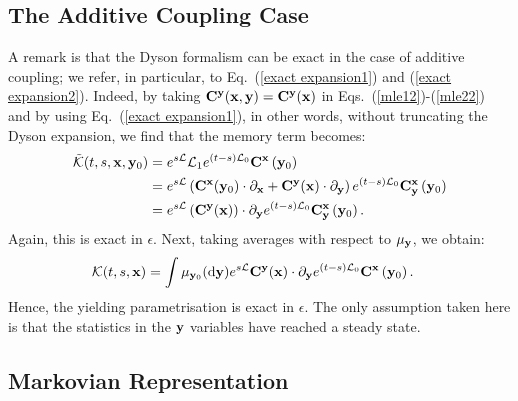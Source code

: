 \documentclass[12pt]{article}
\begin{document}
\subsection{The Additive Coupling Case}

A remark is that the Dyson formalism can be exact in the case of additive coupling; we refer, in particular, to Eq.~(\ref{exact expansion1}) and (\ref{exact expansion2}). Indeed, by taking $\mathbf{C} ^{\mathbf{y}}(\mathbf{x},\mathbf{y})=\mathbf{C} ^{\mathbf{y}}(\mathbf{x})$ in Eqs.~(\ref{mle12})-(\ref{mle22}) and by using Eq.~(\ref{exact expansion1}), in other words, without truncating the Dyson expansion, we find that the memory term becomes:
\begin{align}
	\tilde{\mathcal{K}}(t,s,\mathbf{x},\mathbf{y}_0)&=e^{s\mathcal{L}}\mathcal{L}_1e^{(t-s)\mathcal{L}_0}\mathbf{C}^{\mathbf{x}}\left(\mathbf{y}_0 \right) \\ &= e^{s\mathcal{L}}\left(\mathbf{C}^{\mathbf{x}}(\mathbf{y}_0) \cdot \partial _{\mathbf{x}} + \mathbf{C}^{\mathbf{y}}(\mathbf{x}) \cdot \partial _{\mathbf{y}}\right)e^{(t-s)\mathcal{L}_0}\mathbf{C}_{\mathbf{y}}^{\mathbf{x}}\left(\mathbf{y}_0 \right)\\ &= e^{s\mathcal{L}} \left(\mathbf{C}^{\mathbf{y}}(\mathbf{x}) \right)\cdot \partial _{\mathbf{y}}e^{(t-s)\mathcal{L}_0}\mathbf{C}_{\mathbf{y}}^{\mathbf{x}}\left(\mathbf{y}_0 \right).
\end{align}
Again, this is exact in $\epsilon$. Next, taking averages with respect to $\mu_{\mathbf{y}}$, we obtain:
\begin{align}
\mathcal{K}(t,s,\mathbf{x})&=  \int \mu _{\mathbf{y}_0}(\mathrm{d} \mathbf{y})e^{s\mathcal{L}} \mathbf{C}^{\mathbf{y}}(\mathbf{x}) \cdot \partial _{\mathbf{y}}e^{(t-s)\mathcal{L}_0}\mathbf{C}^{\mathbf{x}}\left(\mathbf{y}_0 \right).
\end{align}
Hence, the yielding parametrisation is exact in $\epsilon$. The only assumption taken here is that the statistics in the $\mathbf{y}$ variables have reached a steady state. 

\subsection{Markovian Representation}
\end{document}
